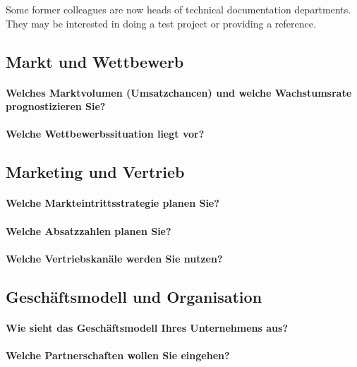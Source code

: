 \documentclass{article}
\begin{document}
Some former colleagues are now heads of technical documentation departments. They may be interested in doing a test project or providing a reference.

\subsection{Markt und Wettbewerb}
\paragraph{Welches Marktvolumen (Umsatzchancen) und welche Wachstumsrate prognostizieren Sie?}

\paragraph{Welche Wettbewerbssituation liegt vor?}


\subsection{Marketing und Vertrieb}
\paragraph{Welche Markteintrittsstrategie planen Sie?}

\paragraph{Welche Absatzzahlen planen Sie?}

\paragraph{Welche Vertriebskanäle werden Sie nutzen?}


\subsection{Geschäftsmodell und Organisation}
\paragraph{Wie sieht das Geschäftsmodell Ihres Unternehmens aus?}

\paragraph{Welche Partnerschaften wollen Sie eingehen?}
\end{document}
